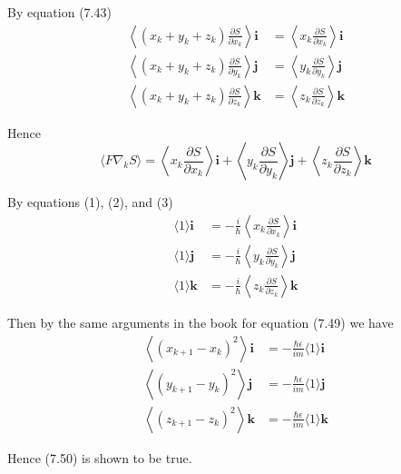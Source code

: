 \documentclass[12pt]{article}
\begin{document}
By equation (7.43)
\begin{align*}
\left\langle(x_k+y_k+z_k)\frac{\partial S}{\partial x_k}\right\rangle\mathbf i
&=\left\langle x_k\frac{\partial S}{\partial x_k}\right\rangle\mathbf i
\\
\left\langle(x_k+y_k+z_k)\frac{\partial S}{\partial y_k}\right\rangle\mathbf j
&=\left\langle y_k\frac{\partial S}{\partial y_k}\right\rangle\mathbf j
\\
\left\langle(x_k+y_k+z_k)\frac{\partial S}{\partial z_k}\right\rangle\mathbf k
&=\left\langle z_k\frac{\partial S}{\partial z_k}\right\rangle\mathbf k
\end{align*}

Hence
\begin{equation*}
\langle F\nabla_kS\rangle
=\left\langle x_k\frac{\partial S}{\partial x_k}\right\rangle\mathbf i
+\left\langle y_k\frac{\partial S}{\partial y_k}\right\rangle\mathbf j
+\left\langle z_k\frac{\partial S}{\partial z_k}\right\rangle\mathbf k
\tag{3}
\end{equation*}

By equations (1), (2), and (3)
\begin{align*}
\langle1\rangle\mathbf i
&=-\frac{i}{\hbar}\left\langle x_k\frac{\partial S}{\partial x_k}\right\rangle\mathbf i
\\
\langle1\rangle\mathbf j
&=-\frac{i}{\hbar}\left\langle y_k\frac{\partial S}{\partial y_k}\right\rangle\mathbf j
\\
\langle1\rangle\mathbf k
&=-\frac{i}{\hbar}\left\langle z_k\frac{\partial S}{\partial z_k}\right\rangle\mathbf k
\end{align*}

Then by the same arguments in the book for equation (7.49) we have
\begin{align*}
\left\langle(x_{k+1}-x_k)^2\right\rangle\mathbf i&=-\frac{\hbar\epsilon}{im}\langle1\rangle\mathbf i
\\
\left\langle(y_{k+1}-y_k)^2\right\rangle\mathbf j&=-\frac{\hbar\epsilon}{im}\langle1\rangle\mathbf j
\\
\left\langle(z_{k+1}-z_k)^2\right\rangle\mathbf k&=-\frac{\hbar\epsilon}{im}\langle1\rangle\mathbf k
\end{align*}

Hence (7.50) is shown to be true.
\end{document}
